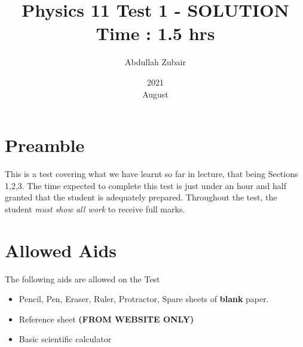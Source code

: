 \documentclass[12pt]{article} %
\title{Physics 11 Test 1 - \textbf{SOLUTION} \\ \textbf{Time : 1.5 hrs}}
\date{2021\\ August}
\author{Abdullah Zubair}
\begin{document}
    \renewcommand*{\coursecode}{Test} %
    \renewcommand*{\assgnnumber}{1} %
    \renewcommand*{\submdate}{August 26, 2021} %
    \renewcommand*{\studentfname}{Abdullah} %
    \renewcommand*{\studentlname}{Zubair} %

    \renewcommand\qedsymbol{$\blacksquare$}
    \setfigpath
    \pagestyle{crowdmark}
    \fancyhfoffset[L,O]{0pt} %




	\maketitle
	\section{Preamble}
	This is a test covering what we have learnt so far in lecture, that being Sections 1,2,3. The time expected to complete this test is just under an hour and half granted that the student is adequately prepared. Throughout the test, the student \emph{must show all work} to receive full marks.
	\section{Allowed Aids}
	The following aids are allowed on the Test
	\begin{itemize}
		\item Pencil, Pen, Eraser, Ruler, Protractor, Spare sheets of \textbf{blank} paper.
		\item Reference sheet \textbf{(FROM WEBSITE ONLY)}
		\item Basic scientific calculator
	\end{itemize}
\end{document}
